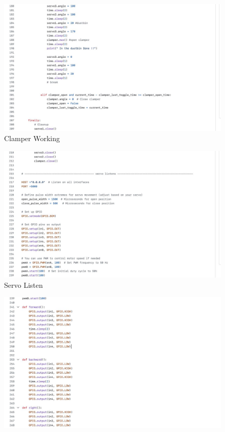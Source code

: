 \newpage
\vspace{1cm}
\begin{figure}[h]
    \centering
    \includegraphics[width=1\linewidth]{Graphics/7clamperWorking.jpg}
    \caption{Clamper Working}
    \label{fig:enter-label}
\end{figure}
\begin{figure}[h]
    \centering
    \includegraphics[width=1\linewidth]{Graphics/8ServoInitializing.jpg}
    \caption{Servo Listen}
    \label{fig:enter-label}
\end{figure}
\begin{figure}[h]
    \centering
    \includegraphics[width=1\linewidth]{Graphics/9functionForBotMotion.jpg}
    \label{fig:enter-label}
\end{figure}
